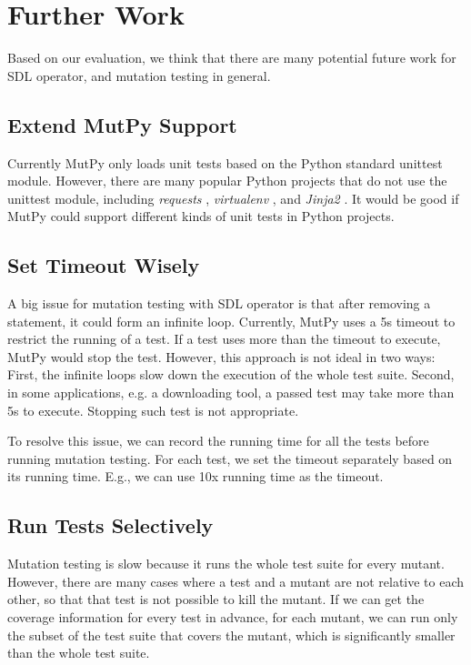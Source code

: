 \documentclass[12pt]{article}
\begin{document}
\section{Further Work}

Based on our evaluation, we think that there are many potential future work for SDL operator, and mutation testing in general.

\subsection{Extend MutPy Support}

Currently MutPy only loads unit tests based on the Python standard unittest module. However, there are many popular Python projects that do not use the unittest module, including \emph{requests} \cite{requests}, \emph{virtualenv} \cite{virtualenv}, and \emph{Jinja2} \cite{jinja2}. It would be good if MutPy could support different kinds of unit tests in Python projects.

\subsection{Set Timeout Wisely}

A big issue for mutation testing with SDL operator is that after removing a statement, it could form an infinite loop. Currently, MutPy uses a 5s timeout to restrict the running of a test. If a test uses more than the timeout to execute, MutPy would stop the test. However, this approach is not ideal in two ways: First, the infinite loops slow down the execution of the whole test suite. Second, in some applications, e.g. a downloading tool, a passed test may take more than 5s to execute. Stopping such test is not appropriate.

To resolve this issue, we can record the running time for all the tests before running mutation testing. For each test, we set the timeout separately based on its running time. E.g., we can use 10x running time as the timeout.

\subsection{Run Tests Selectively}

Mutation testing is slow because it runs the whole test suite for every mutant. However, there are many cases where a test and a mutant are not relative to each other, so that that test is not possible to kill the mutant. If we can get the coverage information for every test in advance, for each mutant, we can run only the subset of the test suite that covers the mutant, which is significantly smaller than the whole test suite.
\end{document}
